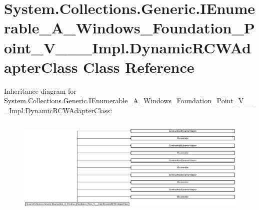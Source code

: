 \hypertarget{class_system_1_1_collections_1_1_generic_1_1_i_enumerable___a___windows___foundation___point___ve20b9192f8d04296ef065958ab3ca1ff}{}\section{System.\+Collections.\+Generic.\+I\+Enumerable\+\_\+\+A\+\_\+\+Windows\+\_\+\+Foundation\+\_\+\+Point\+\_\+\+V\+\_\+\+\_\+\+\_\+\+Impl.\+Dynamic\+R\+C\+W\+Adapter\+Class Class Reference}
\label{class_system_1_1_collections_1_1_generic_1_1_i_enumerable___a___windows___foundation___point___ve20b9192f8d04296ef065958ab3ca1ff}
Inheritance diagram for System.\+Collections.\+Generic.\+I\+Enumerable\+\_\+\+A\+\_\+\+Windows\+\_\+\+Foundation\+\_\+\+Point\+\_\+\+V\+\_\+\+\_\+\+\_\+\+Impl.\+Dynamic\+R\+C\+W\+Adapter\+Class\+:\begin{figure}[H]
\begin{center}
\leavevmode
\includegraphics[height=4.790047cm]{class_system_1_1_collections_1_1_generic_1_1_i_enumerable___a___windows___foundation___point___ve20b9192f8d04296ef065958ab3ca1ff}
\end{center}
\end{figure}
